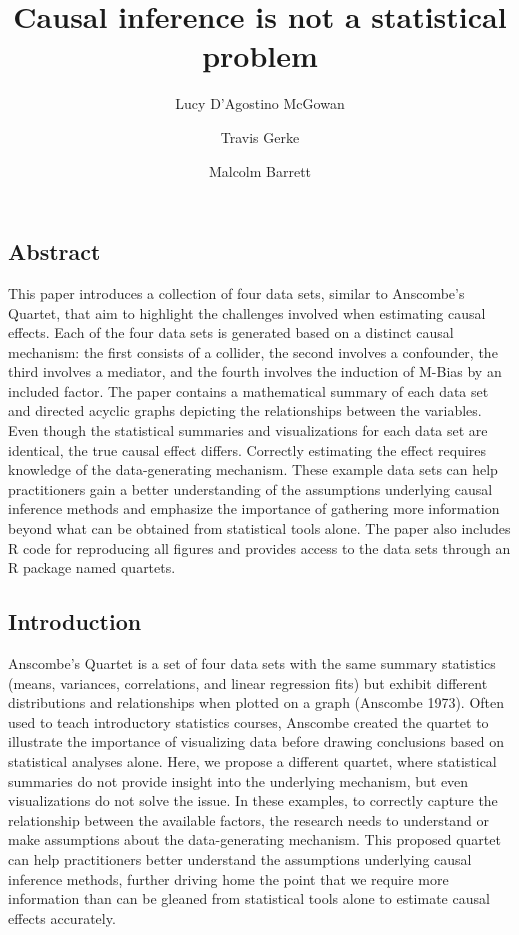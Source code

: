 \documentclass[
  letterpaper,
  DIV=11,
  numbers=noendperiod]{scrartcl}
\title{Causal inference is not a statistical problem}
\author{Lucy D'Agostino McGowan \and Travis Gerke \and Malcolm Barrett}
\date{}
\begin{document}
\maketitle
\ifdefined\Shaded\renewenvironment{Shaded}{\begin{tcolorbox}[boxrule=0pt, sharp corners, interior hidden, breakable, enhanced, borderline west={3pt}{0pt}{shadecolor}, frame hidden]}{\end{tcolorbox}}\fi

\hypertarget{abstract}{%
\subsection{Abstract}\label{abstract}}

This paper introduces a collection of four data sets, similar to
Anscombe's Quartet, that aim to highlight the challenges involved when
estimating causal effects. Each of the four data sets is generated based
on a distinct causal mechanism: the first consists of a collider, the
second involves a confounder, the third involves a mediator, and the
fourth involves the induction of M-Bias by an included factor. The paper
contains a mathematical summary of each data set and directed acyclic
graphs depicting the relationships between the variables. Even though
the statistical summaries and visualizations for each data set are
identical, the true causal effect differs. Correctly estimating the
effect requires knowledge of the data-generating mechanism. These
example data sets can help practitioners gain a better understanding of
the assumptions underlying causal inference methods and emphasize the
importance of gathering more information beyond what can be obtained
from statistical tools alone. The paper also includes R code for
reproducing all figures and provides access to the data sets through an
R package named quartets.

\hypertarget{introduction}{%
\subsection{Introduction}\label{introduction}}

Anscombe's Quartet is a set of four data sets with the same summary
statistics (means, variances, correlations, and linear regression fits)
but exhibit different distributions and relationships when plotted on a
graph (Anscombe 1973). Often used to teach introductory statistics
courses, Anscombe created the quartet to illustrate the importance of
visualizing data before drawing conclusions based on statistical
analyses alone. Here, we propose a different quartet, where statistical
summaries do not provide insight into the underlying mechanism, but even
visualizations do not solve the issue. In these examples, to correctly
capture the relationship between the available factors, the research
needs to understand or make assumptions about the data-generating
mechanism. This proposed quartet can help practitioners better
understand the assumptions underlying causal inference methods, further
driving home the point that we require more information than can be
gleaned from statistical tools alone to estimate causal effects
accurately.
\end{document}
